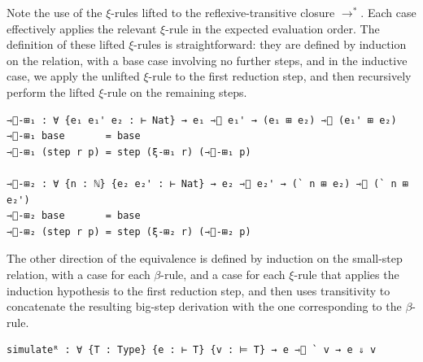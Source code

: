 Note the use of the $\xi$-rules lifted to the reflexive-transitive closure $\longrightarrow^*$. Each case effectively applies the relevant $\xi$-rule in the expected evaluation order.
The definition of these lifted $\xi$-rules is straightforward: they are defined by induction on the relation, with a base case involving no further steps, and in the inductive case, we apply the unlifted $\xi$-rule to the first reduction step, and then recursively
perform the lifted $\xi$-rule on the remaining steps.
\begin{verbatim}
⇾⃰-⊞₁ : ∀ {e₁ e₁' e₂ : ⊢ Nat} → e₁ ⇾⃰ e₁' → (e₁ ⊞ e₂) ⇾⃰ (e₁' ⊞ e₂)
⇾⃰-⊞₁ base       = base
⇾⃰-⊞₁ (step r p) = step (ξ-⊞₁ r) (⇾⃰-⊞₁ p)

⇾⃰-⊞₂ : ∀ {n : ℕ} {e₂ e₂' : ⊢ Nat} → e₂ ⇾⃰ e₂' → (` n ⊞ e₂) ⇾⃰ (` n ⊞ e₂')
⇾⃰-⊞₂ base       = base
⇾⃰-⊞₂ (step r p) = step (ξ-⊞₂ r) (⇾⃰-⊞₂ p)
\end{verbatim}

The other direction of the equivalence is defined by induction on the small-step relation, with a case for each $\beta$-rule, and a case for each $\xi$-rule that applies the induction hypothesis to the first reduction step, and then uses transitivity to concatenate the resulting big-step derivation with the one corresponding to the $\beta$-rule.
\begin{verbatim}
simulateᴿ : ∀ {T : Type} {e : ⊢ T} {v : ⊨ T} → e ⇾⃰ ` v → e ⇓ v
\end{verbatim}

